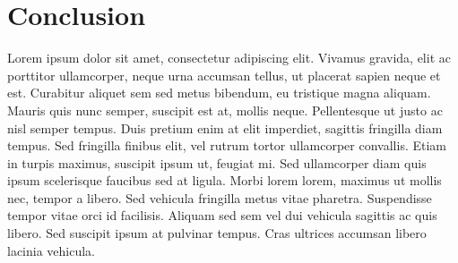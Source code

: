 \section{Conclusion}
Lorem ipsum dolor sit amet, consectetur adipiscing elit. Vivamus gravida, elit ac porttitor ullamcorper, neque urna accumsan tellus, ut placerat sapien neque et est. Curabitur aliquet sem sed metus bibendum, eu tristique magna aliquam. Mauris quis nunc semper, suscipit est at, mollis neque. Pellentesque ut justo ac nisl semper tempus. Duis pretium enim at elit imperdiet, sagittis fringilla diam tempus. Sed fringilla finibus elit, vel rutrum tortor ullamcorper convallis. Etiam in turpis maximus, suscipit ipsum ut, feugiat mi. Sed ullamcorper diam quis ipsum scelerisque faucibus sed at ligula. Morbi lorem lorem, maximus ut mollis nec, tempor a libero. Sed vehicula fringilla metus vitae pharetra. Suspendisse tempor vitae orci id facilisis. Aliquam sed sem vel dui vehicula sagittis ac quis libero. Sed suscipit ipsum at pulvinar tempus. Cras ultrices accumsan libero lacinia vehicula.